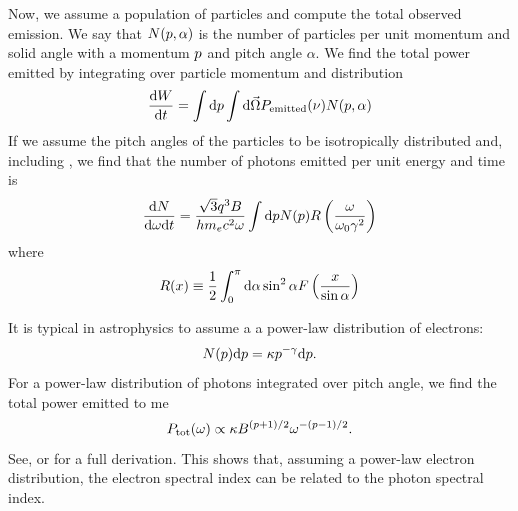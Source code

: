 Now, we assume a population of particles and compute the total observed
emission. We say that $N(p,\alpha)$ is the
number of particles per unit momentum and solid angle with a momentum
$p$ and pitch angle $\alpha$.  We find the total power emitted
by integrating over particle momentum and distribution
\begin{equation}
  \frac{\text{d} W}{\text{d}t}=
  \int \text{d} p 
  \int \text{d} \vec\Omega
  P_\text{emitted}(\nu)
  N(p,\alpha)
\end{equation}
If we assume the pitch angles of the particles to be isotropically
distributed and, including , we
find that the number of photons emitted per unit energy and time is
\begin{equation}
  \frac{\text{d} N}{\text{d} \omega \text{d} t} =
  \frac{\sqrt{3}q^3 B}{h m_e c^2 \omega}
  \int \text{d}p
  N(p)
  R \left(\frac{\omega}{\omega_0 \gamma^2}\right)
\end{equation}
where
\begin{equation}
  R(x) \equiv \frac{1}{2} \int_0^\pi
  \text{d} \alpha \sin^2 \alpha
  F\left(\frac{x}{\sin\alpha}\right)
\end{equation}

It is typical in astrophysics to assume a 
a power-law distribution of electrons:
\begin{equation}
\eqnlabel{ElectronPowerLawEnergyDistribution}
  \ParticleDistribution(\momentum) \derivative\momentum = 
  \kappa \momentum^{-\spectralindex} \derivative\momentum.
\end{equation}
For a power-law distribution of photons integrated over
pitch angle, we find the total power emitted to me 
\begin{equation}
P_\text{tot}(\omega) \propto \kappa B^{(p+1)/2} 
\omega^{-(p-1)/2}.
\end{equation}
See, \cite{rybicki_1979a_radiative-processes} 
or \cite{longair_2013a_energy-astrophysics} for a full derivation.
This shows that, assuming a power-law electron distribution,
the electron spectral index can be related to the photon spectral
index.

\subsection{}

